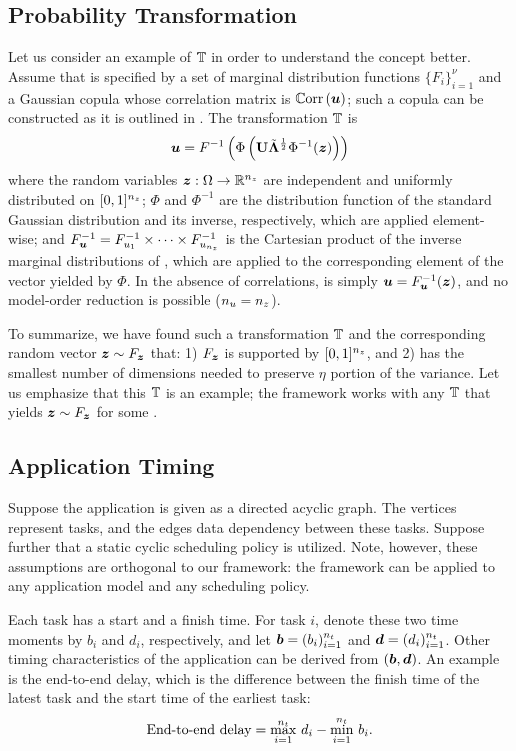 \subsection{Probability Transformation}

Let us consider an example of $\transform$ in order to understand the concept
better. Assume that \vu is specified by a set of marginal distribution functions
$\{ F_i \}_{i = 1}^\nu$ and a Gaussian copula whose correlation matrix is
$\correlation{\vu}$; such a copula can be constructed as it is outlined in
. The transformation $\transform$ is
\[
  \boldsymbol{u} = F^{-1} \left(\Phi\left(\mathbf{U} \tilde{\mathbf{\Lambda}}^\frac{1}{2} \Phi^{-1}(\boldsymbol{z})\right)\right)
\]
where the random variables $\boldsymbol{z}: \Omega \to \mathbb{R}^{n_{z}}$ are independent and
uniformly distributed on $[0, 1]^{n_{z}}$; $\Phi$ and $\Phi^{-1}$ are the
distribution function of the standard Gaussian distribution and its inverse,
respectively, which are applied element-wise; and $F_{\boldsymbol{u}}^{-1} = F_{u_1}^{-1}
\times \cdots \times F_{u_{n_{z}}}^{-1}$ is the Cartesian product of the inverse
marginal distributions of \vu, which are applied to the corresponding element of
the vector yielded by $\Phi$. In the absence of correlations,
 is simply $\boldsymbol{u} = F_{\boldsymbol{u}}^{-1}(\boldsymbol{z})$, and no
model-order reduction is possible (${n_{u}} = {n_{z}}$).

To summarize, we have found such a transformation $\transform$ and the
corresponding random vector $\boldsymbol{z} \sim F_{\boldsymbol{z}}$ that: 1) $F_{\boldsymbol{z}}$ is supported
by $[0, 1]^{n_{z}}$, and 2) \vz has the smallest number of dimensions \nz needed to
preserve $\eta$ portion of the variance. Let us emphasize that this $\transform$
is an example; the framework works with any $\transform$ that yields $\boldsymbol{z} \sim
F_{\boldsymbol{z}}$ for some \nz.

\subsection{Application Timing}

Suppose the application is given as a directed acyclic graph. The vertices
represent tasks, and the edges data dependency between these tasks. Suppose
further that a static cyclic scheduling policy is utilized. Note, however, these
assumptions are orthogonal to our framework: the framework can be applied to any
application model and any scheduling policy.

Each task has a start and a finish time. For task $i$, denote these two time
moments by $b_i$ and $d_i$, respectively, and let $\boldsymbol{b} = (b_i)_{i = 1}^{n_{t}}$
and $\boldsymbol{d} = (d_i)_{i = 1}^{n_{t}}$. Other timing characteristics of the application
can be derived from $(\boldsymbol{b}, \boldsymbol{d})$. An example is the end-to-end delay, which
is the difference between the finish time of the latest task and the start time
of the earliest task:
\[
  \text{End-to-end delay} = \max_{i = 1}^{n_{t}} \, d_i - \min_{i = 1}^{n_{t}} \, b_i.
\]

